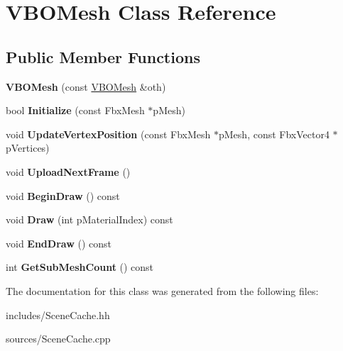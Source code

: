 \hypertarget{class_v_b_o_mesh}{\section{V\-B\-O\-Mesh Class Reference}
\label{class_v_b_o_mesh}
}
\subsection*{Public Member Functions}
\begin{DoxyCompactItemize}
\item 
\hypertarget{class_v_b_o_mesh_a6e4e8265e397691c5fe1c6a2a070befe}{{\bfseries V\-B\-O\-Mesh} (const \hyperlink{class_v_b_o_mesh}{V\-B\-O\-Mesh} \&oth)}\label{class_v_b_o_mesh_a6e4e8265e397691c5fe1c6a2a070befe}

\item 
\hypertarget{class_v_b_o_mesh_a352852754a2a04d4328ec1b874c9eec4}{bool {\bfseries Initialize} (const Fbx\-Mesh $\ast$p\-Mesh)}\label{class_v_b_o_mesh_a352852754a2a04d4328ec1b874c9eec4}

\item 
\hypertarget{class_v_b_o_mesh_a155632f1b85e12395d40843a96decbf7}{void {\bfseries Update\-Vertex\-Position} (const Fbx\-Mesh $\ast$p\-Mesh, const Fbx\-Vector4 $\ast$p\-Vertices)}\label{class_v_b_o_mesh_a155632f1b85e12395d40843a96decbf7}

\item 
\hypertarget{class_v_b_o_mesh_ac5ba70bd2517740f6c10325bf5eb501d}{void {\bfseries Upload\-Next\-Frame} ()}\label{class_v_b_o_mesh_ac5ba70bd2517740f6c10325bf5eb501d}

\item 
\hypertarget{class_v_b_o_mesh_ab4924ef5a9a5bc6eccd54fa584a1242e}{void {\bfseries Begin\-Draw} () const }\label{class_v_b_o_mesh_ab4924ef5a9a5bc6eccd54fa584a1242e}

\item 
\hypertarget{class_v_b_o_mesh_aab0f47b5227a025f1a483775f7f29e05}{void {\bfseries Draw} (int p\-Material\-Index) const }\label{class_v_b_o_mesh_aab0f47b5227a025f1a483775f7f29e05}

\item 
\hypertarget{class_v_b_o_mesh_adec8b31ebfd103b894eccc8cf1939d69}{void {\bfseries End\-Draw} () const }\label{class_v_b_o_mesh_adec8b31ebfd103b894eccc8cf1939d69}

\item 
\hypertarget{class_v_b_o_mesh_a42c5ea4f5535b03786c3500cdeec504b}{int {\bfseries Get\-Sub\-Mesh\-Count} () const }\label{class_v_b_o_mesh_a42c5ea4f5535b03786c3500cdeec504b}

\end{DoxyCompactItemize}


The documentation for this class was generated from the following files\-:\begin{DoxyCompactItemize}
\item 
includes/Scene\-Cache.\-hh\item 
sources/Scene\-Cache.\-cpp\end{DoxyCompactItemize}
